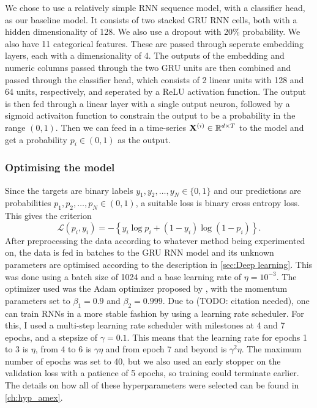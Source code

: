\documentclass{statsmsc}
\begin{document}
{We chose to use a relatively simple \ac{RNN} sequence model, with a classifier head, as our
baseline model.
It consists of two stacked \ac{GRU} \ac{RNN} cells, both with a hidden dimensionality of 128.
We also use a dropout with 20\% probability. We also have 11 categorical features. These are
passed through seperate embedding layers, each with a dimensionality of 4. The outputs of the
embedding and numeric columns passed through the two \ac{GRU} units are then combined and
passed through the classifier head, which consists of 2 linear units with 128 and 64 units,
respectively, and seperated by a \ac{ReLU} activation function. The output is then fed through
a linear layer with a single output neuron, followed by a sigmoid activaiton function to constrain
the output to be a probability in the range $(0,1)$. Then we can feed in a time-series
$\mathbf{X}^{(i)} \in \mathbb{R}^{d \times T}$ to the model and get a probability $p_i \in (0,1)$ as the
output.

\subsubsection{Optimising the model}%
\label{ssub:Optimising the model}

Since the targets are binary labels $y_1,y_2,\dots,y_N \in \{0,1\}$ and our predictions are
probabilities $p_1,p_2,\dots,p_N \in (0,1)$, a suitable loss is binary cross entropy loss.
This gives the criterion
\begin{equation}
    \mathcal{L}(p_i,y_i)=- \left\{y_i \log p_i + (1-y_i) \log\left( 1- p_i \right)\right\}.
\end{equation}
After preprocessing the data according to whatever method being experimented on, the data is fed
in batches to the \ac{GRU} \ac{RNN} model and its unknown parameters are optimised according
to the description in \cref{sec:Deep learning}. This was done using a batch size of 1024 and
a base learning rate of $\eta=10^{-3}$. The optimizer used was the Adam optimizer proposed by
\cite{adam}, with the momentum parameters set to $\beta_1=0.9$ and $\beta_2=0.999$.
Due to (TODO: citation needed), one can train \acp{RNN} in a more stable fashion by using a
learning rate scheduler. For this, I used a multi-step learning rate scheduler with milestones
at 4 and 7 epochs, and a stepsize of $\gamma=0.1$. This means that the learning rate for epochs
1 to 3 is $\eta$, from 4 to 6 is $\gamma\eta$ and from epoch 7 and beyond is $\gamma^2\eta$.
The maximum number of epochs was set to 40, but we also used an early stopper on the validation loss
with a patience of 5 epochs, so training could terminate earlier.
The details on how all of these hyperparameters were selected can be found in \cref{ch:hyp_amex}.

}
\end{document}
